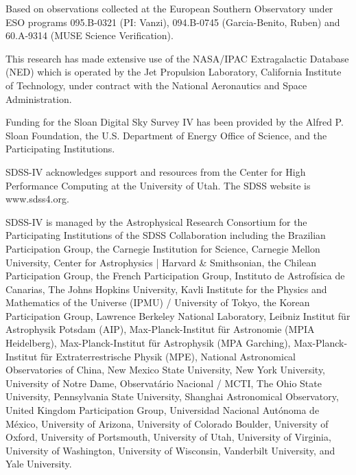 \documentclass[linenumbers]{aastex63}
\begin{document}
Based on observations collected at the European Southern Observatory under ESO programs 095.B-0321 (PI: Vanzi), 094.B-0745 (Garcia-Benito, Ruben) and 60.A-9314 (MUSE Science Verification).

This research has made extensive use of the NASA/IPAC Extragalactic Database (NED) which is operated by the Jet Propulsion Laboratory, California Institute of Technology, under contract with the National Aeronautics and Space Administration.

Funding for the Sloan Digital Sky 
Survey IV has been provided by the 
Alfred P. Sloan Foundation, the U.S. 
Department of Energy Office of 
Science, and the Participating 
Institutions. 

SDSS-IV acknowledges support and 
resources from the Center for High 
Performance Computing  at the 
University of Utah. The SDSS 
website is www.sdss4.org.

SDSS-IV is managed by the 
Astrophysical Research Consortium 
for the Participating Institutions 
of the SDSS Collaboration including 
the Brazilian Participation Group, 
the Carnegie Institution for Science, 
Carnegie Mellon University, Center for 
Astrophysics | Harvard \& 
Smithsonian, the Chilean Participation 
Group, the French Participation Group, 
Instituto de Astrof\'isica de 
Canarias, The Johns Hopkins 
University, Kavli Institute for the 
Physics and Mathematics of the 
Universe (IPMU) / University of 
Tokyo, the Korean Participation Group, 
Lawrence Berkeley National Laboratory, 
Leibniz Institut f\"ur Astrophysik 
Potsdam (AIP),  Max-Planck-Institut 
f\"ur Astronomie (MPIA Heidelberg), 
Max-Planck-Institut f\"ur 
Astrophysik (MPA Garching), 
Max-Planck-Institut f\"ur 
Extraterrestrische Physik (MPE), 
National Astronomical Observatories of 
China, New Mexico State University, 
New York University, University of 
Notre Dame, Observat\'ario 
Nacional / MCTI, The Ohio State 
University, Pennsylvania State 
University, Shanghai 
Astronomical Observatory, United 
Kingdom Participation Group, 
Universidad Nacional Aut\'onoma 
de M\'exico, University of Arizona, 
University of Colorado Boulder, 
University of Oxford, University of 
Portsmouth, University of Utah, 
University of Virginia, University 
of Washington, University of 
Wisconsin, Vanderbilt University, 
and Yale University.



 
\end{document}
